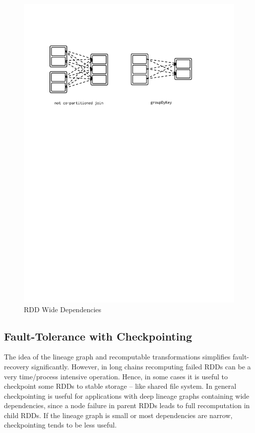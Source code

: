 \begin{itemize}
\begin{figure}[p]
        \includegraphics[clip,trim=2cm 19.5cm 3.5cm 4cm]{wide-dep.pdf}
        \caption{RDD Wide Dependencies}
        \label{fig:sp:wide-dep}
    \end{figure}
\end{itemize}

\subsection{Fault-Tolerance with Checkpointing}
\label{sp:fault}

The idea of the lineage graph and recomputable transformations simplifies fault-recovery significantly. However, in long chains recomputing failed RDDs can be a very time/process intensive operation. Hence, in some cases it is useful to checkpoint some RDDs to stable storage -- like shared file system. In general checkpointing is useful for applications with deep lineage graphs containing wide dependencies, since a node failure in parent RDDs leads to full recomputation in child RDDs. If the lineage graph is small or most dependencies are narrow, checkpointing tends to be less useful. 

